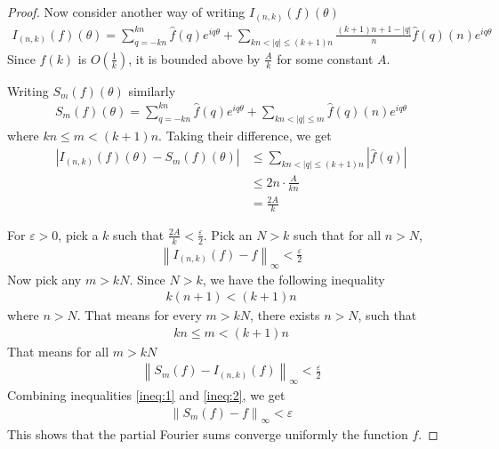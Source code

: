 \documentclass[12pt, titlepage]{article}
\theoremstyle{definition}
\newcommand{\vep}{\varepsilon}
\newcommand{\norm}[1]{\left\lVert#1\right\rVert}
\begin{document}
\begin{proof}
    Now consider another way of writing $I_{(n,k)}(f)(\theta)$
    \begin{align*}
        I_{(n,k)}(f)(\theta) = \sum_{q=-kn}^{kn} \widehat{f}(q) e^{iq\theta} + \sum_{kn < |q| \leq (k+1)n} \frac{(k+1)n + 1 - |q|}{n} \widehat{f}(q)(n) e^{iq\theta}
    \end{align*}
    Since $\widehat{f}(k)$ is $O\left( \frac{1}{k} \right)$, it is bounded above by $\frac{A}{k}$ for some constant $A$.
    
    Writing $S_m(f)(\theta)$ similarly
    \begin{align*}
     S_m(f)(\theta) = \sum_{q=-kn}^{kn} \widehat{f}(q) e^{iq\theta} + \sum_{kn < |q| \leq m} \widehat{f}(q)(n) e^{iq\theta}
    \end{align*}
    where $kn \leq m < (k+1)n$.
    Taking their difference, we get
    \begin{align*}
        |I_{(n,k)}(f)(\theta) - S_m(f)(\theta)| &\leq \sum_{kn < |q| \leq (k+1)n} |\widehat{f}(q)| \\
        &\leq 2n \cdot \frac{A}{kn} \\
        &= \frac{2A}{k}
    \end{align*}
    
    For $\vep > 0$, pick a $k$ such that $\frac{2A}{k} < \frac{\vep}{2}$. Pick an $N > k$ such that for all $n > N$,
    \begin{align}
        \norm{I_{(n,k)}(f) - f}_{\infty} < \frac{\vep}{2} \label{ineq:1}
    \end{align}
    Now pick any $m > kN$. Since $N > k$, we have the following inequality
    \begin{align*}
        k(n+1) < (k+1)n
    \end{align*}
    where $n > N$. That means for every $m > kN$, there exists $n > N$, such that
    \begin{align*}
        kn \leq  m < (k+1)n
    \end{align*}
    That means for all $m > kN$
    \begin{align}
        \norm{S_m(f) - I_{(n,k)}(f)}_\infty < \frac{\vep}{2} \label{ineq:2}
    \end{align}
    Combining inequalities \ref{ineq:1} and \ref{ineq:2}, we get
    \begin{align*}
        \norm{S_m(f) - f}_\infty < \vep
    \end{align*}
    This shows that the partial Fourier sums converge uniformly the function $f$.
\end{proof}
\end{document}
